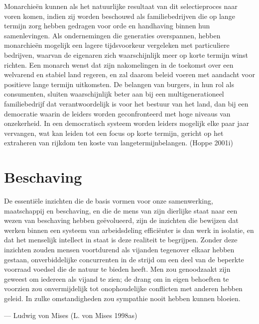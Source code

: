 \documentclass[
  a5paper,
  smalldemyvopaper,11pt,twoside,onecolumn,openright,extrafontsizes,
hidelinks]{memoir}
\begin{document}
Monarchieën kunnen als het natuurlijke resultaat van dit selectieproces
naar voren komen, indien zij worden beschouwd als familiebedrijven die
op lange termijn zorg hebben gedragen voor orde en handhaving binnen hun
samenlevingen. Als ondernemingen die generaties overspannen, hebben
monarchieën mogelijk een lagere tijdsvoorkeur vergeleken met
particuliere bedrijven, waarvan de eigenaren zich waarschijnlijk meer op
korte termijn winst richten. Een monarch wenst dat zijn nakomelingen in
de toekomst over een welvarend en stabiel land regeren, en zal daarom
beleid voeren met aandacht voor positieve lange termijn uitkomsten. De
belangen van burgers, in hun rol als consumenten, sluiten waarschijnlijk
beter aan bij een multigenerationeel familiebedrijf dat verantwoordelijk
is voor het bestuur van het land, dan bij een democratie waarin de
leiders worden geconfronteerd met hoge niveaus van onzekerheid. In een
democratisch systeem worden leiders mogelijk elke paar jaar vervangen,
wat kan leiden tot een focus op korte termijn, gericht op het extraheren
van rijkdom ten koste van langetermijnbelangen. (Hoppe 2001i)

\chapter{Beschaving}\label{sec-beschaving}

De essentiële inzichten die de basis vormen voor onze samenwerking,
maatschappij en beschaving, en die de mens van zijn dierlijke staat naar
een wezen van beschaving hebben geëvolueerd, zijn de inzichten die
bewijzen dat werken binnen een systeem van arbeidsdeling efficiënter is
dan werk in isolatie, en dat het menselijk intellect in staat is deze
realiteit te begrijpen. Zonder deze inzichten zouden mensen voortdurend
als vijanden tegenover elkaar hebben gestaan, onverbiddelijke
concurrenten in de strijd om een deel van de beperkte voorraad voedsel
die de natuur te bieden heeft. Men zou genoodzaakt zijn geweest om
iedereen als vijand te zien; de drang om in eigen behoeften te voorzien
zou onvermijdelijk tot onophoudelijke conflicten met anderen hebben
geleid. In zulke omstandigheden zou sympathie nooit hebben kunnen
bloeien.

--- Ludwig von Mises (L. von Mises 1998as)
\end{document}
